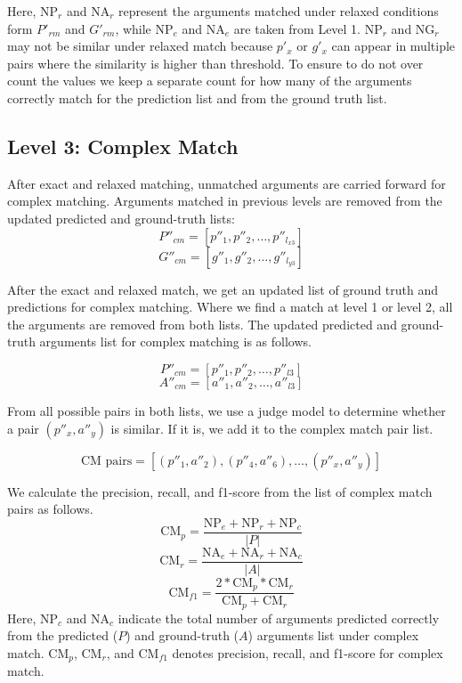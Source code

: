 Here, \(\text{NP}_r\) and \(\text{NA}_r\) represent the arguments matched under relaxed conditions form $P'_{rm}$ and $G'_{rm}$, while \(\text{NP}_e\) and \(\text{NA}_e\) are taken from Level 1.  $\text{NP}_r$ and $\text{NG}_r$ may not be similar under relaxed match because $p'_x$ or $g'_x$ can appear in multiple pairs where the similarity is higher than threshold. To ensure to do not over count the values we keep a separate count for how many of the arguments correctly match for the prediction list and from the ground truth list. 


\subsection{Level 3: Complex Match}

After exact and relaxed matching, unmatched arguments are carried forward for complex matching. Arguments matched in previous levels are removed from the updated predicted and ground-truth lists:
\[
P''_{cm} = [p''_1, p''_2, \ldots, p''_{l_{x3}}]
\]
\[
G''_{cm} = [g''_1, g''_2, \ldots, g''_{l_{y3}}] 
\]



After the exact and relaxed match, we get an updated list of ground truth and predictions for complex matching. Where we find a match at level 1 or level 2, all the arguments are removed from both lists. The updated predicted and ground-truth arguments list for complex matching is as follows. 

\[
P''_{cm} = [p''_1, p''_2, \ldots, p''_{l3}]
\]
\[
A''_{cm} = [a''_1, a''_2, \ldots, a''_{l3}] 
\]

From all possible pairs in both lists, we use a judge model to determine whether a pair $(p''_x, a''_y)$ is similar. If it is, we add it to the complex match pair list. 

\[
\text{CM pairs} = [(p''_1, a''_2), (p''_4, a''_6), \ldots, (p''_x, a''_y)]
\]

\noindent
We calculate the precision, recall, and f1-score from the list of complex match pairs as follows.
\[
\text{CM}_{p} = \frac{\text{NP}_e + \text{NP}_r + \text{NP}_c}{|P|}
\]
\[
\text{CM}_{r} = \frac{\text{NA}_e + \text{NA}_r + \text{NA}_c}{|A|}
\]
\[
\text{CM}_{f1} = \frac{2 * \text{CM}_{p} * \text{CM}_{r}}{\text{CM}_{p}+\text{CM}_{r}}
\]
Here, $\text{NP}_c$ and $\text{NA}_c$ indicate the total number of arguments predicted correctly from the predicted ($P$) and ground-truth ($A$) arguments list under complex match. $\text{CM}_{p}$, $\text{CM}_{r}$, and $\text{CM}_{f1}$ denotes precision, recall, and f1-score for complex match.


